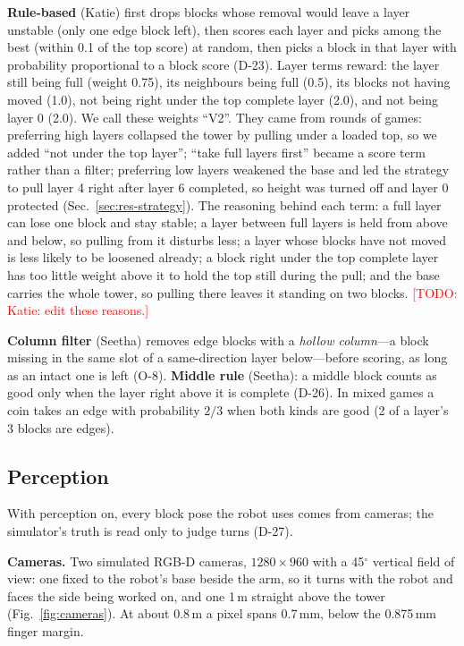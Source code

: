 \documentclass[conference]{IEEEtran}
\newcommand{\todo}[1]{\textcolor{red}{[TODO: #1]}}
\begin{document}
\textbf{Rule-based} (Katie) first drops blocks whose removal would leave a layer unstable (only one edge block left),
then scores each layer and picks among the best (within 0.1 of the top score) at random, then picks a block in that
layer with probability proportional to a block score (D-23). Layer terms reward: the layer still being full (weight
0.75), its neighbours being full (0.5), its blocks not having moved (1.0), not being right under the top complete layer
(2.0), and not being layer 0 (2.0). We call these weights ``V2''. They came from rounds of games: preferring high layers collapsed the tower by pulling
under a loaded top, so we added ``not under the top layer''; ``take full layers first'' became a score term rather than a
filter; preferring low layers weakened the base and led the strategy to pull layer 4 right after layer 6 completed, so
height was turned off and layer 0 protected (Sec.~\ref{sec:res-strategy}). The reasoning behind each term: a full
layer can lose one block and stay stable; a layer between full layers is held from above and below, so pulling from it
disturbs less; a layer whose blocks have not moved is less likely to be loosened already; a block right under the top
complete layer has too little weight above it to hold the top still during the pull; and the base carries the whole
tower, so pulling there leaves it standing on two blocks. \todo{Katie: edit these reasons.}

\textbf{Column filter} (Seetha) removes edge blocks with a \emph{hollow column}---a block missing in the same slot of a
same-direction layer below---before scoring, as long as an intact one is left (O-8). \textbf{Middle rule} (Seetha): a
middle block counts as good only when the layer right above it is complete (D-26). In mixed games a coin takes an edge
with probability $2/3$ when both kinds are good (2 of a layer's 3 blocks are edges).

\subsection{Perception}\label{sec:perception}
With perception on, every block pose the robot uses comes from cameras; the simulator's truth is read only to judge
turns (D-27).

\textbf{Cameras.} Two simulated RGB-D cameras, $1280\times960$ with a 45$^\circ$ vertical field of view: one fixed to
the robot's base beside the arm, so it turns with the robot and faces the side being worked on, and one 1\,m straight
above the tower (Fig.~\ref{fig:cameras}). At about 0.8\,m a pixel spans 0.7\,mm, below the 0.875\,mm finger margin.
\end{document}

